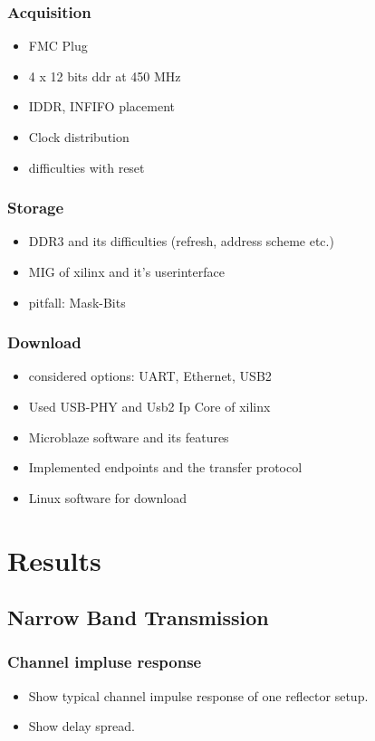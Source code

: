 \subsection{Acquisition}
\begin{itemize}
\item FMC Plug
\item 4 x 12 bits ddr at 450 MHz
\item IDDR, INFIFO placement
\item Clock distribution
\item difficulties with reset 
\end{itemize}

\subsection{Storage}
\begin{itemize}
\item DDR3 and its difficulties (refresh, address scheme etc.)
\item MIG of xilinx and it's userinterface
\item pitfall: Mask-Bits 
\end{itemize}

\subsection{Download}
\begin{itemize}
\item considered options: UART, Ethernet, USB2
\item Used USB-PHY and Usb2 Ip Core of xilinx
\item Microblaze software and its features
\item Implemented endpoints and the transfer protocol
\item Linux software for download
\end{itemize}

\chapter{Results}
\section{Narrow Band Transmission}
\subsection{Channel impluse response}
\begin{itemize}
\item Show typical channel impulse response of one reflector setup.
\item Show delay spread.
\end{itemize}

